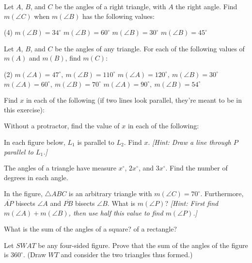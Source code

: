 \documentclass[12pt]{book} %
\begin{document}
\begin{ExerciseList}
	\Exercise Let $A$, $B$, and $C$ be the angles of a right triangle, with $A$ the right angle. Find $m(\angle C)$ when $m(\angle B)$ has the following values:
	\begin{tasks}(4)
		\task[(a)] $m(\angle B)=34^\circ$
		\task[(b)] $m(\angle B)=60^\circ$
		\task[(c)] $m(\angle B)=30^\circ$
		\task[(d)] $m(\angle B)=45^\circ$
	\end{tasks}
	
	\Exercise Let $A$, $B$, and $C$ be the angles of any triangle. For each of the following values of $m(A)$ and $m(B)$, find $m(C)$:
	\begin{tasks}(2)
		\task[(a)] $m(\angle A)=47^\circ,\ m(\angle B)=110^\circ$
		\task[(b)] $m(\angle A)=120^\circ,\ m(\angle B)=30^\circ$
		\task[(c)] $m(\angle A)=60^\circ,\ m(\angle B)=70^\circ$
		\task[(d)] $m(\angle A)=90^\circ,\ m(\angle B)=54^\circ$
	\end{tasks}
	
	\Exercise Find $x$ in each of the following (if two lines look parallel, they're meant to be in this exercise):
	
	
	\Exercise Without a protractor, find the value of $x$ in each of the following:
	
	
	\Exercise In each figure below, $L_1$ is parallel to $L_2$. Find $x$. \textit{[Hint: Draw a line through $P$ parallel to $L_1$.]}
	
	
	\Exercise The angles of a triangle have measure $x^\circ$, $2x^\circ$, and $3x^\circ$. Find the number of degrees in each angle.
	
	\Exercise In the figure, $\triangle ABC$ is an arbitrary triangle with $m(\angle C)=70^\circ$. Furthermore, $\overline{AP}$ bisects $\angle A$ and $\overline{PB}$ bisects $\angle B$. What is $m(\angle P)$? \textit{[Hint: First find $m(\angle A)+m(\angle B)$, then use half this value to find $m(\angle P)$.]}
	
	
	\Exercise What is the sum of the angles of a square? of a rectangle?
	
	\Exercise Let $SWAT$ be any four-sided figure. Prove that the sum of the angles of the figure is $360^\circ$. (Draw $WT$ and consider the two triangles thus formed.)
	

\end{ExerciseList}
\end{document}
